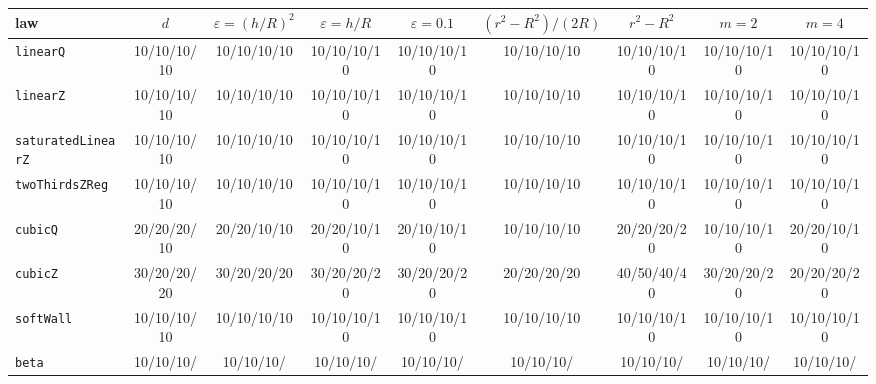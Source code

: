 \begin{tabular}{lcccccccc}
\toprule
law & $d$ & $\varepsilon=(h/R)^2$ & $\varepsilon=h/R$ & $\varepsilon=0.1$ & $(r^2-R^2)/(2R)$ & $r^2-R^2$ & $m=2$ & $m=4$ \\
\midrule
\texttt{linearQ} & 10/10/10/10 & 10/10/10/10 & 10/10/10/10 & 10/10/10/10 & 10/10/10/10 & 10/10/10/10 & 10/10/10/10 & 10/10/10/10 \\
\texttt{linearZ} & 10/10/10/10 & 10/10/10/10 & 10/10/10/10 & 10/10/10/10 & 10/10/10/10 & 10/10/10/10 & 10/10/10/10 & 10/10/10/10 \\
\texttt{saturatedLinearZ} & 10/10/10/10 & 10/10/10/10 & 10/10/10/10 & 10/10/10/10 & 10/10/10/10 & 10/10/10/10 & 10/10/10/10 & 10/10/10/10 \\
\texttt{twoThirdsZReg} & 10/10/10/10 & 10/10/10/10 & 10/10/10/10 & 10/10/10/10 & 10/10/10/10 & 10/10/10/10 & 10/10/10/10 & 10/10/10/10 \\
\texttt{cubicQ} & 20/20/20/10 & 20/20/10/10 & 20/20/10/10 & 20/10/10/10 & 10/10/10/10 & 20/20/20/20 & 10/10/10/10 & 20/20/10/10 \\
\texttt{cubicZ} & 30/20/20/20 & 30/20/20/20 & 30/20/20/20 & 30/20/20/20 & 20/20/20/20 & 40/50/40/40 & 30/20/20/20 & 20/20/20/20 \\
\texttt{softWall} & 10/10/10/10 & 10/10/10/10 & 10/10/10/10 & 10/10/10/10 & 10/10/10/10 & 10/10/10/10 & 10/10/10/10 & 10/10/10/10 \\
\texttt{beta} & 10/10/10/ & 10/10/10/ & 10/10/10/ & 10/10/10/ & 10/10/10/ & 10/10/10/ & 10/10/10/ & 10/10/10/ \\
\bottomrule
\end{tabular}
